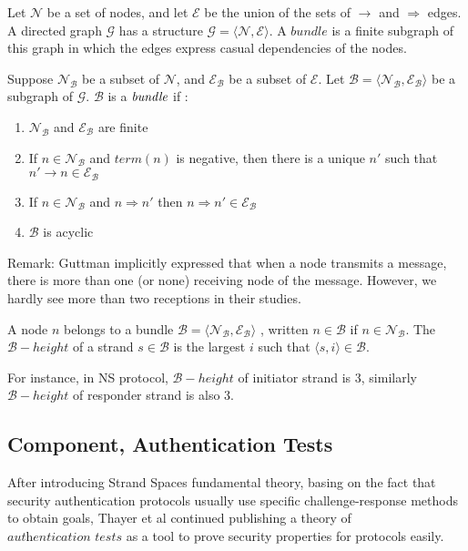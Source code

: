 Let $\mathcal{N}$ be a set of nodes, and let $\mathcal{E}$ be the union of the sets of $\rightarrow$ and $\Rightarrow$ edges. A directed graph $\mathcal{G}$ has a structure $\mathcal{G} = \langle \mathcal{N},\mathcal{E}\rangle$. A $bundle$ is a finite subgraph of this graph in which the edges express casual dependencies of the nodes.

\begin{Definition} Suppose $\mathcal{N_B}$ be a subset of $\mathcal{N}$, and $\mathcal{E_B}$ be a subset of $\mathcal{E}$. Let $\mathcal{B} = \langle \mathcal{N_B},\mathcal{E_B}\rangle$ be a subgraph of $\mathcal{G}$. $\mathcal{B}$ is a $\emph{bundle}$ if :
\begin{enumerate}
\item $\mathcal{N_B}$ and $\mathcal{E_B}$ are finite
\item If $n \in \mathcal{N_B}$ and $term(n)$ is negative, then there is a unique $n'$ such that $ n' \rightarrow n \in \mathcal{E_B}$
\item If $n \in \mathcal{N_B}$ and $n \Rightarrow n'$ then $n \Rightarrow n' \in \mathcal{E_B}$ 
\item $\mathcal{B}$ is acyclic
\end{enumerate}
\end{Definition}

Remark: Guttman implicitly expressed that when a node transmits a message, there is more than one (or none) receiving node of the message. However, we hardly see more than two receptions in their studies. 

\begin{Definition}
A node $n$ belongs to a bundle $\mathcal{B} = \langle \mathcal{N_B},\mathcal{E_B}\rangle$ , written $n \in \mathcal{B}$ if $n \in \mathcal{N_B}$. The $\mathcal{B} -height$ of a strand $s \in \mathcal{B}$ is the largest $i$ such that $\langle s,i \rangle \in \mathcal{B}$. 
\end{Definition}

For instance, in NS protocol, $\mathcal{B}-height$ of initiator strand is 3, similarly $\mathcal{B}-height$ of responder strand is also 3.
\subsection{Component, Authentication Tests}

After introducing Strand Spaces fundamental theory, basing on the fact that security authentication protocols usually use specific challenge-response methods to obtain goals, Thayer et al\cite{authenticationtests} continued publishing a theory of $\textit{authentication tests}$ as a tool to prove security properties for protocols easily. 

